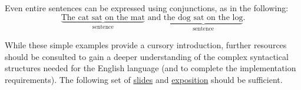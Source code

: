 \documentclass{article}
\begin{document}
    \vspace{2mm}
    Even entire sentences can be expressed using conjunctions, as in the following: 
    $$\underbrace{\text{The cat sat on the mat}}_{\text{sentence}}\text{ and }\underbrace{\text{the dog sat on the log}}_{\text{sentence}}.$$ 

    \vspace{2mm}
    While these simple examples provide a cursory introduction, further resources should be consulted to gain a deeper understanding of the complex syntactical structures needed for the English language (and to complete the implementation requirements). The following set of \href{http://www.cs.columbia.edu/~mcollins/cs4705-spring2020/slides/parsing1.pdf}{slides} and \href{http://faculty.washington.edu/cicero/370syntax.htm}{exposition} should be sufficient.
\end{document}
